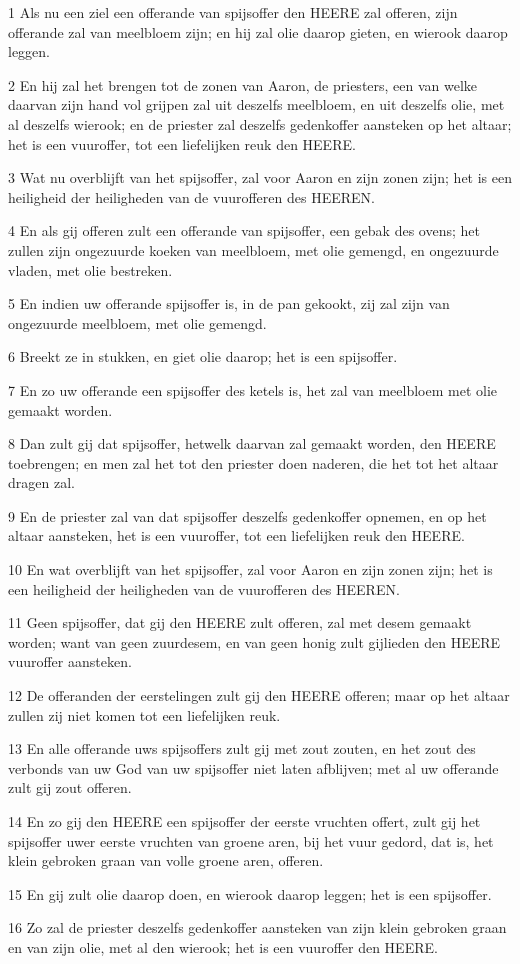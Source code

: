 \par 1 Als nu een ziel een offerande van spijsoffer den HEERE zal offeren, zijn offerande zal van meelbloem zijn; en hij zal olie daarop gieten, en wierook daarop leggen.
\par 2 En hij zal het brengen tot de zonen van Aaron, de priesters, een van welke daarvan zijn hand vol grijpen zal uit deszelfs meelbloem, en uit deszelfs olie, met al deszelfs wierook; en de priester zal deszelfs gedenkoffer aansteken op het altaar; het is een vuuroffer, tot een liefelijken reuk den HEERE.
\par 3 Wat nu overblijft van het spijsoffer, zal voor Aaron en zijn zonen zijn; het is een heiligheid der heiligheden van de vuurofferen des HEEREN.
\par 4 En als gij offeren zult een offerande van spijsoffer, een gebak des ovens; het zullen zijn ongezuurde koeken van meelbloem, met olie gemengd, en ongezuurde vladen, met olie bestreken.
\par 5 En indien uw offerande spijsoffer is, in de pan gekookt, zij zal zijn van ongezuurde meelbloem, met olie gemengd.
\par 6 Breekt ze in stukken, en giet olie daarop; het is een spijsoffer.
\par 7 En zo uw offerande een spijsoffer des ketels is, het zal van meelbloem met olie gemaakt worden.
\par 8 Dan zult gij dat spijsoffer, hetwelk daarvan zal gemaakt worden, den HEERE toebrengen; en men zal het tot den priester doen naderen, die het tot het altaar dragen zal.
\par 9 En de priester zal van dat spijsoffer deszelfs gedenkoffer opnemen, en op het altaar aansteken, het is een vuuroffer, tot een liefelijken reuk den HEERE.
\par 10 En wat overblijft van het spijsoffer, zal voor Aaron en zijn zonen zijn; het is een heiligheid der heiligheden van de vuurofferen des HEEREN.
\par 11 Geen spijsoffer, dat gij den HEERE zult offeren, zal met desem gemaakt worden; want van geen zuurdesem, en van geen honig zult gijlieden den HEERE vuuroffer aansteken.
\par 12 De offeranden der eerstelingen zult gij den HEERE offeren; maar op het altaar zullen zij niet komen tot een liefelijken reuk.
\par 13 En alle offerande uws spijsoffers zult gij met zout zouten, en het zout des verbonds van uw God van uw spijsoffer niet laten afblijven; met al uw offerande zult gij zout offeren.
\par 14 En zo gij den HEERE een spijsoffer der eerste vruchten offert, zult gij het spijsoffer uwer eerste vruchten van groene aren, bij het vuur gedord, dat is, het klein gebroken graan van volle groene aren, offeren.
\par 15 En gij zult olie daarop doen, en wierook daarop leggen; het is een spijsoffer.
\par 16 Zo zal de priester deszelfs gedenkoffer aansteken van zijn klein gebroken graan en van zijn olie, met al den wierook; het is een vuuroffer den HEERE.

